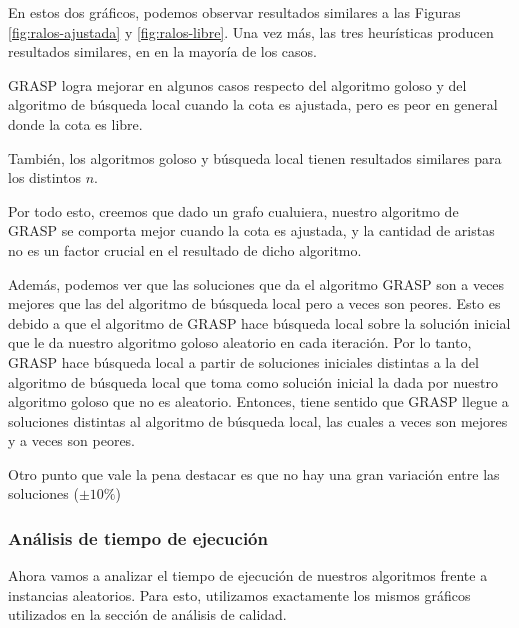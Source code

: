 En estos dos gráficos, podemos observar resultados similares a las Figuras \ref{fig:ralos-ajustada} y \ref{fig:ralos-libre}. Una vez más, las tres heurísticas producen resultados similares, en en la mayoría de los casos.

GRASP logra mejorar en algunos casos respecto del algoritmo goloso y del algoritmo de búsqueda local cuando la cota es ajustada, pero es peor en general donde la cota es libre.

También, los algoritmos goloso y búsqueda local tienen resultados similares para los distintos $n$.

Por todo esto, creemos que dado un grafo cualuiera, nuestro algoritmo de GRASP se comporta mejor cuando la cota es ajustada, y la cantidad de aristas no es un factor crucial en el resultado de dicho algoritmo.

Además, podemos ver que las soluciones que da el algoritmo GRASP son a veces mejores que las del algoritmo de búsqueda local pero a veces son peores. Esto es debido a que el algoritmo de GRASP hace búsqueda local sobre la solución inicial que le da nuestro algoritmo goloso aleatorio en cada iteración. Por lo tanto, GRASP hace búsqueda local a partir de soluciones iniciales distintas a la del algoritmo de búsqueda local que toma como solución inicial la dada por nuestro algoritmo goloso que no es aleatorio. Entonces, tiene sentido que GRASP llegue a soluciones distintas al algoritmo de búsqueda local, las cuales a veces son mejores y a veces son peores.

Otro punto que vale la pena destacar es que no hay una gran variación entre las soluciones ($ \pm 10\%$)

\subsubsection{Análisis de tiempo de ejecución}

Ahora vamos a analizar el tiempo de ejecución de nuestros algoritmos frente a instancias aleatorios. Para esto, utilizamos exactamente los mismos gráficos utilizados en la sección de análisis de calidad.

